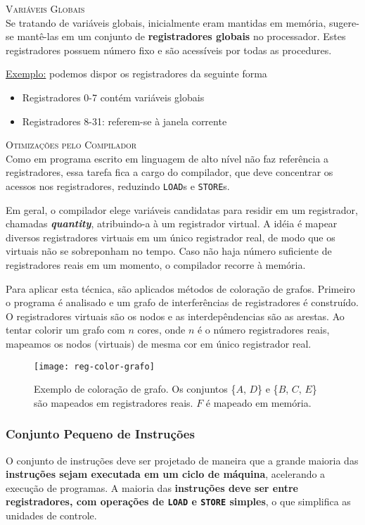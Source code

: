 \textsc{Variáveis Globais}\\
Se tratando de variáveis globais, inicialmente eram mantidas em memória, sugere-se mantê-las em um conjunto de \textbf{registradores globais} no processador. Estes registradores possuem número fixo e são acessíveis por todas as procedures.

\underline{Exemplo:} podemos dispor os registradores da seguinte forma
\begin{itemize}
  \item Registradores 0-7 contém variáveis globais
  \item Registradores 8-31: referem-se à janela corrente
\end{itemize}

\textsc{Otimizações pelo Compilador}\\
Como em programa escrito em linguagem de alto nível não faz referência a registradores, essa tarefa fica a cargo do compilador, que deve concentrar os acessos nos registradores, reduzindo \texttt{LOAD}s e \texttt{STORE}s.

Em geral, o compilador elege variáveis candidatas para residir em um registrador, chamadas \textbf{\textit{quantity}}, atribuindo-a à um registrador virtual. A idéia é mapear diversos registradores virtuais em um único registrador real, de modo que os virtuais não se sobreponham no tempo. Caso não haja número suficiente de registradores reais em um momento, o compilador recorre à memória.

Para aplicar esta técnica, são aplicados métodos de coloração de grafos. Primeiro o programa é analisado e um grafo de interferências de registradores é construído. O registradores virtuais são os nodos e as interdepêndencias são as arestas. Ao tentar colorir um grafo com $n$ cores, onde $n$ é o número registradores reais, mapeamos os nodos (virtuais) de mesma cor em único registrador real.

\begin{figure}
  \centering
  \texttt{[image: reg-color-grafo]}
  \label{fig:reg-color-grafo}
  \caption{Exemplo de coloração de grafo. Os conjuntos \{$A$, $D$\} e \{$B$, $C$, $E$\} são mapeados em registradores reais. $F$ é mapeado em memória.}
\end{figure}




\subsubsection{Conjunto Pequeno de Instruções}
O conjunto de instruções deve ser projetado de maneira que a grande maioria das \textbf{instruções sejam executada em um ciclo de máquina}, acelerando a execução de programas. A maioria das \textbf{instruções deve ser entre registradores, com operações de \texttt{LOAD} e \texttt{STORE} simples}, o que simplifica as unidades de controle.

